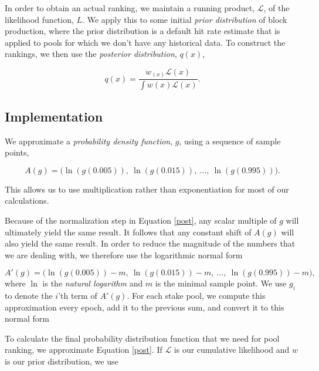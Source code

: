 \documentclass[11pt,a4paper,dvipsnames,twosided]{article}
\begin{document}
In order to obtain an actual ranking, we maintain a running product, $\mathcal{L}$, of the likelihood function, $L$.
We apply this to some initial \emph{prior distribution}
of block production, where %
the prior distribution is a default hit rate estimate that is applied to pools for which we don't have any historical data.
%
To construct the rankings, we then use the \emph{posterior distribution}, $q(x)$,

\begin{equation}
\label{post}
q(x) = \frac{w_(x)\mathcal{L}(x)}{\int w(x)\mathcal{L}(x)}.
\end{equation}

\subsection{Implementation}

We approximate a \emph{probability density function}, $g$, using a sequence of sample points,

\[ A(g) = \big(\ln(g(0.005)),~ \ln(g(0.015)),~ \ldots,~ \ln(g(0.995))\big). \]

This allows us to use multiplication rather than exponentiation for most of our calculations.

Because of the normalization step in Equation \eqref{post}, any scalar multiple of $g$
will ultimately yield the same result. It follows that any constant shift of $A(g)$ will also yield the same result.
In order to reduce the magnitude of the numbers that we are dealing with, we therefore use the logarithmic normal form

\[ A'(g) = \big(\ln(g(0.005)) - m,~ \ln(g(0.015)) - m,~ \ldots,~ \ln(g(0.995)) - m\big), \]
where $\ln$ is the \emph{natural logarithm} and $m$ is the minimal sample point. We use $g_i$ to denote the $i$'th term of $A'(g)$.
For each stake pool, we compute this approximation every epoch, add it to the previous sum, and convert it to this normal form

To calculate the final probability distribution function that we need for pool ranking, we approximate Equation \eqref{post}.
If $\mathcal{L}$ is our cumulative likelihood and $w$ is our prior distribution, we use
\end{document}
